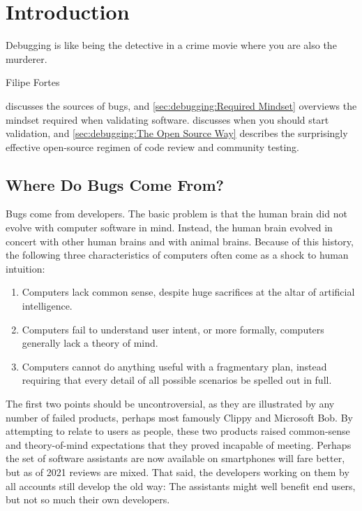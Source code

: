 \section{Introduction}
\label{sec:debugging:Introduction}
%
\epigraph{Debugging is like being the detective in a crime movie where
	  you are also the murderer.}
	 {Filipe Fortes}

discusses the sources of bugs, and
\cref{sec:debugging:Required Mindset}
overviews the mindset required when validating software.
discusses when you should start validation, and
\cref{sec:debugging:The Open Source Way} describes the
surprisingly effective open-source regimen of code review and
community testing.

\subsection{Where Do Bugs Come From?}
\label{sec:debugging:Where Do Bugs Come From?}

Bugs come from developers.
The basic problem is that the human brain did not evolve with computer
software in mind.
Instead, the human brain evolved in concert with other human brains and
with animal brains.
Because of this history, the following three characteristics of computers
often come as a shock to human intuition:

\begin{enumerate}
\item	Computers lack common sense, despite huge sacrifices at the
	altar of artificial intelligence.
\item	Computers fail to understand user intent, or more formally,
	computers generally lack a theory of mind.
\item	Computers cannot do anything useful with a fragmentary plan,
	instead requiring that every detail of all possible scenarios
	be spelled out in full.
\end{enumerate}

The first two points should be uncontroversial, as they are illustrated
by any number of failed products, perhaps most famously Clippy and
Microsoft Bob.
By attempting to relate to users as people, these two products raised
common-sense and theory-of-mind expectations that they proved incapable
of meeting.
Perhaps the set of software assistants are now available on smartphones
will fare better, but as of 2021 reviews are mixed.
That said, the developers working on them by all accounts still develop
the old way:
The assistants might well benefit end users, but not so much their own
developers.

